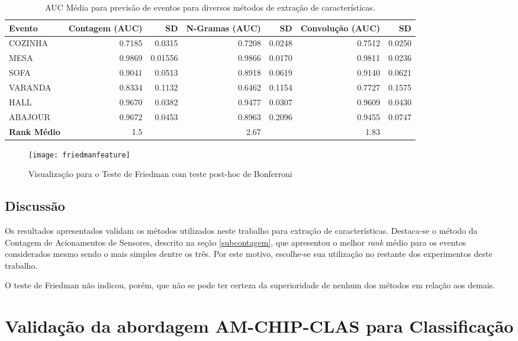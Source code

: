 \documentclass[
	12pt,				%
	openright,			%
	twoside,			%
	a4paper,			%
	english,			%
	spanish,			%
	brazil,				%
	]{abntex2}\usepackage[]{graphicx}\usepackage[]{color}
\begin{document}
\begin{table}[ht]
\centering
\caption{AUC Média para previsão de eventos para diversos métodos de extração de características.} 
\label{tabfeatures}
\begin{tabular}{lrrrrrr}
  \hline
Evento & Contagem (AUC) & SD & N-Gramas (AUC) & SD & Convolução (AUC) & SD \\ 
  \hline
  COZINHA & 0.7185 & 0.0315 & 0.7208 & 0.0248 & 0.7512 & 0.0250 \\ 
  MESA & 0.9869 & 0.01556 & 0.9866 & 0.0170 & 0.9811 & 0.0236 \\ 
  SOFA & 0.9041 & 0.0513 & 0.8918 & 0.0619 & 0.9140 & 0.0621 \\ 
  VARANDA & 0.8334 & 0.1132 & 0.6462 & 0.1154 & 0.7727 & 0.1575 \\ 
    HALL & 0.9670 & 0.0382 & 0.9477 & 0.0307 & 0.9609 & 0.0430 \\ 
  ABAJOUR & 0.9672 & 0.0453 & 0.8963 & 0.2096 & 0.9455 & 0.0747 \\ 
   \hline
\textbf{Rank Médio} & 1.5 &  & 2.67 & & 1.83 & \\ 
   \hline
\end{tabular}
\end{table}

\begin{figure}[ht]
\texttt{[image: friedmanfeature]}
\caption{Visualização para o Teste de Friedman com teste post-hoc de Bonferroni}
\label{friedmanfeat}
\end{figure}

\FloatBarrier

\subsection{Discussão}

Os resultados apresentados validam os métodos utilizados neste trabalho para extração de características. Destaca-se o método da Contagem de Acionamentos de Sensores, descrito na seção \ref{subcontagem}, que apresentou o melhor \textit{rank} médio para os eventos considerados mesmo sendo o mais simples dentre os três. Por este motivo, escolhe-se sua utilização no restante dos experimentos deste trabalho.

O teste de Friedman não indicou, porém, que não se pode ter certeza da superioridade de nenhum dos métodos em relação aos demais.

\section{Validação da abordagem AM-CHIP-CLAS para Classificação}
\end{document}

